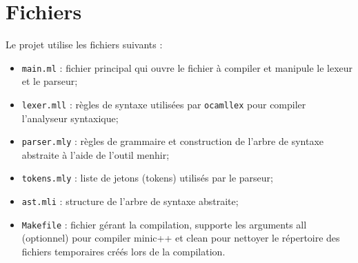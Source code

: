 \documentclass{article}
\begin{document}
\section*{Fichiers}
Le projet utilise les fichiers suivants :
\begin{itemize}
  \item \texttt{main.ml} : fichier principal qui ouvre le fichier à
    compiler et manipule le lexeur et le parseur;
  \item \texttt{lexer.mll} : règles de syntaxe utilisées par \texttt{ocamllex} pour
    compiler l'analyseur syntaxique;
  \item \texttt{parser.mly} : règles de grammaire et construction de l'arbre de
    syntaxe abstraite à l'aide de l'outil menhir;
  \item \texttt{tokens.mly} : liste de jetons (tokens) utilisés par le parseur;
  \item \texttt{ast.mli} : structure de l'arbre de syntaxe abstraite;
  \item \texttt{Makefile} : fichier gérant la compilation, supporte les
    arguments all (optionnel) pour compiler minic++ et clean pour
    nettoyer le répertoire des fichiers temporaires créés lors de la compilation.
\end{itemize}
  
\end{document}
